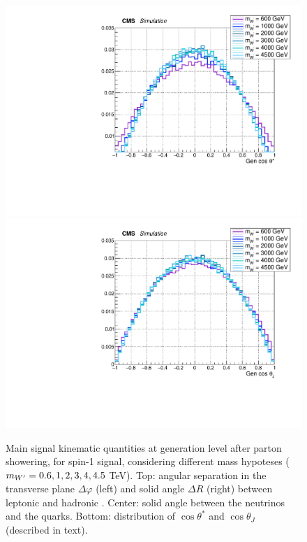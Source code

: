 \begin{figure}[!htb]
\begin{center}
     \includegraphics[width=.495\textwidth]{Gen_v9/XWZInv_g_CosThetaStar.pdf}%
     \includegraphics[width=.495\textwidth]{Gen_v9/XWZInv_g_CosThetaJ.pdf}%
   \end{center}
   \caption{Main signal kinematic quantities at generation level after parton showering, for spin-1 \Wp signal, considering different mass hypoteses ($m_{W'} = 0.6, 1, 2, 3, 4, 4.5$ TeV). Top: angular separation in the transverse plane $\Delta \varphi$ (left) and solid angle $\Delta R$ (right) between leptonic \Z and hadronic \W. Center: solid angle between the neutrinos and the quarks. Bottom: distribution of $\cos{\theta}^{*}$ and $\cos{\theta}_{J}$ (described in text).}
   \label{fig:genWprimeSignal3}
 \end{figure}

\clearpage

